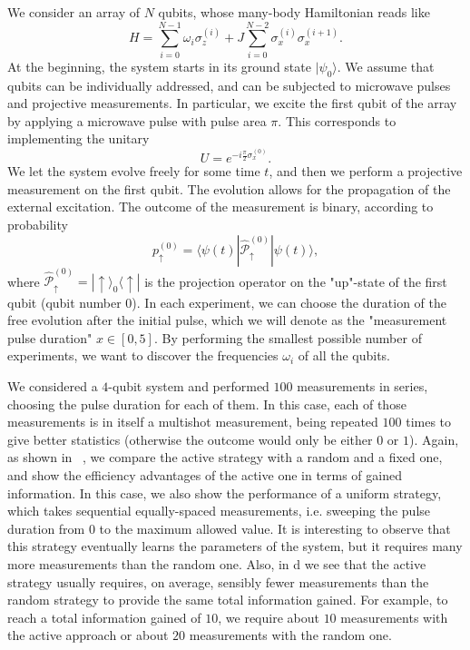 \documentclass[10pt]{iopart}  %
\begin{document}
We consider an array of $N$ qubits, whose many-body Hamiltonian reads like
\begin{equation}
    H=\sum_{i=0}^{N-1} \omega_i \sigma_z^{(i)} + J \sum_{i=0}^{N-2} \sigma_x^{(i)} \sigma_x^{(i+1)}.
\end{equation}
At the beginning, the system starts in its ground state $|\psi_0\rangle$.
We assume that qubits can be individually addressed, and can be subjected to microwave pulses and projective measurements.
In particular, we excite the first qubit of the array by applying a microwave pulse with pulse area $\pi$.
This corresponds to implementing the unitary
\begin{equation}
    U=e^{-i\frac{\pi}{2}\sigma_x^{(0)}}.
\end{equation}
We let the system evolve freely for some time $t$, and then we perform a projective measurement on the first qubit.
The evolution allows for the propagation of the external excitation.
The outcome of the measurement is binary, according to probability
\begin{equation}
    p_\uparrow^{(0)} =\langle \psi(t) | \hat{\mathcal P}_{\uparrow}^{(0)} | \psi(t) \rangle,
\end{equation}
where $\hat{\mathcal P}_{\uparrow}^{(0)}= |\uparrow\rangle_0 \langle \uparrow|$ is the projection operator on the "up"-state of the first qubit (qubit number $0$).
In each experiment, we can choose the duration of the free evolution after the initial pulse, which we will denote as the "measurement pulse duration" $x\in[0,5]$.
By performing the smallest possible number of experiments, we want to discover the frequencies $\omega_i$ of all the qubits.

We considered a $4$-qubit system and performed $100$ measurements in series, choosing the pulse duration for each of them.
In this case, each of those measurements is in itself a multishot measurement, being repeated $100$ times to give better statistics (otherwise the outcome would only be either $0$ or $1$).
Again, as shown in ~, we compare the active strategy with a random and a fixed one, and show the efficiency advantages of the active one in terms of gained information.
In this case, we also show the performance of a uniform strategy, which takes sequential equally-spaced measurements, i.e. sweeping the pulse duration from $0$ to the maximum allowed value.
It is interesting to observe that this strategy eventually learns the parameters of the system, but it requires many more measurements than the random one.
Also, in d we see that the active strategy usually requires, on average, sensibly fewer measurements than the random strategy to provide the same total information gained. For example, to reach a total information gained of $10$, we require about $10$ measurements with the active approach or about $20$ measurements with the random one.
\end{document}
